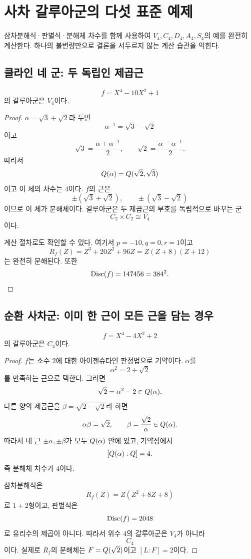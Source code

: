 \clearpage
\section{사차 갈루아군의 다섯 표준 예제}
\label{sec:quartic-worked-examples}

\begin{learninggoal}
삼차분해식·판별식·분해체 차수를 함께 사용하여 $V_4,C_4,D_4,A_4,S_4$의 예를 완전히 계산한다. 하나의 불변량만으로 결론을 서두르지 않는 계산 습관을 익힌다.
\end{learninggoal}

\subsection{클라인 네 군: 두 독립인 제곱근}

\begin{example}
\label{ex:quartic-v4}
\[
  f=X^4-10X^2+1
\]
의 갈루아군은 $V_4$이다.
\end{example}

\begin{proof}
$\alpha=\sqrt3+\sqrt2$라 두면
\[
  \alpha^{-1}=\sqrt3-\sqrt2
\]
이고
\[
  \sqrt3=\frac{\alpha+\alpha^{-1}}2,
  \qquad
  \sqrt2=\frac{\alpha-\alpha^{-1}}2.
\]
따라서
\[
  Q(\alpha)=Q(\sqrt2,\sqrt3)
\]
이고 이 체의 차수는 $4$이다. $f$의 근은
\[
  \pm(\sqrt3+\sqrt2),
  \qquad
  \pm(\sqrt3-\sqrt2)
\]
이므로 이 체가 분해체이다. 갈루아군은 두 제곱근의 부호를 독립적으로 바꾸는 군
\[
  C_2\times C_2\cong V_4
\]
이다.

계산 절차로도 확인할 수 있다. 여기서 $p=-10,q=0,r=1$이고
\[
  R_f(Z)=Z^3+20Z^2+96Z
  =Z(Z+8)(Z+12)
\]
는 완전히 분해된다. 또한
\[
  \operatorname{Disc}(f)=147456=384^2.
\]
\end{proof}

\subsection{순환 사차군: 이미 한 근이 모든 근을 담는 경우}

\begin{example}
\label{ex:quartic-c4}
\[
  f=X^4-4X^2+2
\]
의 갈루아군은 $C_4$이다.
\end{example}

\begin{proof}
$f$는 소수 $2$에 대한 아이젠슈타인 판정법으로 기약이다. $\alpha$를
\[
  \alpha^2=2+\sqrt2
\]
를 만족하는 근으로 택한다. 그러면
\[
  \sqrt2=\alpha^2-2\in Q(\alpha).
\]
다른 양의 제곱근을 $\beta=\sqrt{2-\sqrt2}$라 하면
\[
  \alpha\beta=\sqrt2,
  \qquad
  \beta=\frac{\sqrt2}{\alpha}\in Q(\alpha).
\]
따라서 네 근 $\pm\alpha,\pm\beta$가 모두 $Q(\alpha)$ 안에 있고, 기약성에서
\[
  [Q(\alpha):Q]=4.
\]
즉 분해체 차수가 $4$이다.

삼차분해식은
\[
  R_f(Z)=Z(Z^2+8Z+8)
\]
로 $1+2$형이고, 판별식은
\[
  \operatorname{Disc}(f)=2048
\]
로 유리수의 제곱이 아니다. 따라서 위수 $4$의 갈루아군은 $V_4$가 아니라
\[
  C_4
\]
이다. 실제로 $R_f$의 분해체는 $F=Q(\sqrt2)$이고 $[L:F]=2$이다.
\end{proof}

